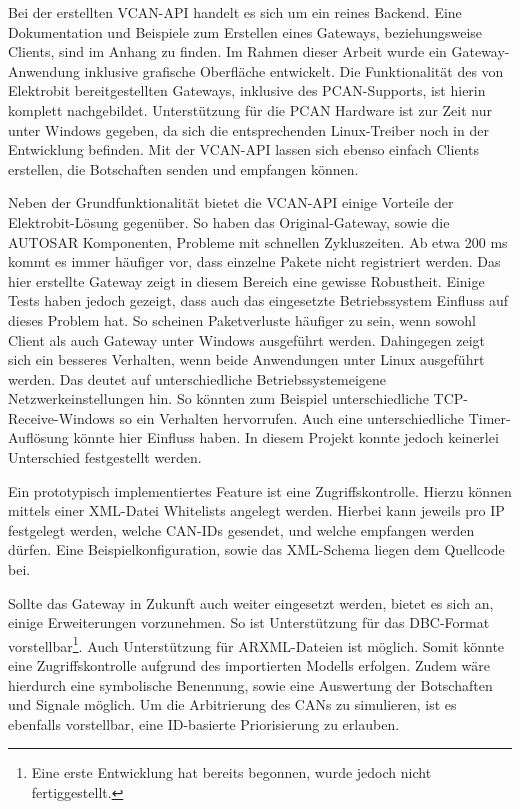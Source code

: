 \documentclass[
  a4paper,					    %
  twoside,
  DIV=calc,     				%
  bibliography=totoc,
  cleardoublepage=empty,
  ngerman,     					%
  final       					%
]{scrbook}
\begin{document}
Bei der erstellten VCAN-API handelt es sich um ein reines Backend. Eine Dokumentation und Beispiele zum Erstellen eines Gateways, beziehungsweise Clients, sind im Anhang zu finden. Im Rahmen dieser Arbeit wurde ein Gateway-Anwendung inklusive grafische Oberfläche entwickelt. Die Funktionalität des von Elektrobit bereitgestellten Gateways, inklusive des PCAN-Supports, ist hierin komplett nachgebildet. Unterstützung für die PCAN Hardware ist zur Zeit nur unter Windows gegeben, da sich die entsprechenden Linux-Treiber noch in der Entwicklung befinden. Mit der VCAN-API lassen sich ebenso einfach Clients erstellen, die Botschaften senden und empfangen können.

Neben der Grundfunktionalität bietet die VCAN-API einige Vorteile der Elektrobit-Lösung gegenüber. So haben das Original-Gateway, sowie die AUTOSAR Komponenten, Probleme mit schnellen Zykluszeiten. Ab etwa 200 ms kommt es immer häufiger vor, dass einzelne Pakete nicht registriert werden. Das hier erstellte Gateway zeigt in diesem Bereich eine gewisse Robustheit. Einige Tests haben jedoch gezeigt, dass auch das eingesetzte Betriebssystem Einfluss auf dieses Problem hat. So scheinen Paketverluste häufiger zu sein, wenn sowohl Client als auch Gateway unter Windows ausgeführt werden. Dahingegen zeigt sich ein besseres Verhalten, wenn beide Anwendungen unter Linux ausgeführt werden. Das deutet auf unterschiedliche Betriebssystemeigene Netzwerkeinstellungen hin. So könnten zum Beispiel unterschiedliche TCP-Receive-Windows so ein Verhalten hervorrufen. Auch eine unterschiedliche Timer-Auflösung könnte hier Einfluss haben. In diesem Projekt konnte jedoch keinerlei Unterschied festgestellt werden.

Ein prototypisch implementiertes Feature ist eine Zugriffskontrolle. Hierzu können mittels einer XML-Datei Whitelists angelegt werden. Hierbei kann jeweils pro IP festgelegt werden, welche CAN-IDs gesendet, und welche empfangen werden dürfen. Eine Beispielkonfiguration, sowie das XML-Schema liegen dem Quellcode bei.

Sollte das Gateway in Zukunft auch weiter eingesetzt werden, bietet es sich an, einige Erweiterungen vorzunehmen. So ist Unterstützung für das DBC-Format vorstellbar\footnote{Eine erste Entwicklung hat bereits begonnen, wurde jedoch nicht fertiggestellt.}. Auch Unterstützung für ARXML-Dateien ist möglich. Somit könnte eine Zugriffskontrolle aufgrund des importierten Modells erfolgen. Zudem wäre hierdurch eine symbolische Benennung, sowie eine Auswertung der Botschaften und Signale möglich. Um die Arbitrierung des CANs zu simulieren, ist es ebenfalls vorstellbar, eine ID-basierte Priorisierung zu erlauben.
\end{document}
